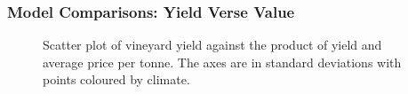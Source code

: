 \documentclass[review,12pt,authoryear]{elsarticle}
\begin{document}
\begin{linenumbers}
\subsubsection{Model Comparisons: Yield Verse Value}
%
\begin{figure}\label{fig:yield_vs_value}
  \caption{Scatter plot of vineyard yield against the product of yield and average price per tonne. The axes are in standard deviations with points coloured by climate.}
\end{figure}
%
\begin{figure}\label{fig:yield_vs_value_area}

\end{figure}
\end{linenumbers}
\end{document}
